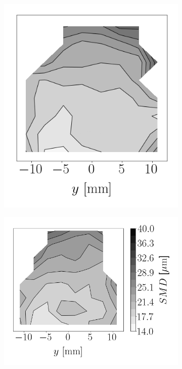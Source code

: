 \begin{figure}[t!]
\begin{subfigure}[b]{0.2\textwidth}
\end{subfigure}
\hspace*{0.02in}
\begin{subfigure}[b]{0.2\textwidth}
	\flushleft
   \includegraphics[scale=0.4]{./part2_developments/figures_ch6_lagrangian_JICF/apte_model_calibration_u_vw_lognorm/maps/k1_0p05_k2_0p5_SMD}
\end{subfigure}
\hspace*{0.02in}
\begin{subfigure}[b]{0.2\textwidth}
	\flushleft
   \includegraphics[scale=0.4]{./part2_developments/figures_ch6_lagrangian_JICF/apte_model_calibration_u_vw_lognorm/maps/k1_0p05_k2_1p0_SMD}
\end{subfigure}



\end{figure}
